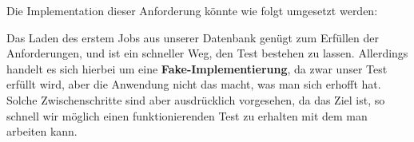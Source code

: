 Die Implementation dieser Anforderung könnte wie folgt umgesetzt werden:
%                                                                                                                                                                    
%                                                                                                                                                                    
\begin{ruby}[label=app/controllers/jobs\_controller.rb]
   
   
      
\end{ruby}

\tddgreen
Das Laden des erstem Jobs aus unserer Datenbank genügt zum Erfüllen der Anforderungen, und ist ein schneller Weg, den Test bestehen zu lassen. Allerdings handelt es sich hierbei um eine \textbf{Fake-Implementierung}, da zwar unser Test erfüllt wird, aber die Anwendung nicht das macht, was man sich erhofft hat. Solche Zwischenschritte sind aber ausdrücklich vorgesehen, da das Ziel ist, so schnell wir möglich einen funktionierenden Test zu erhalten mit dem man arbeiten kann.


